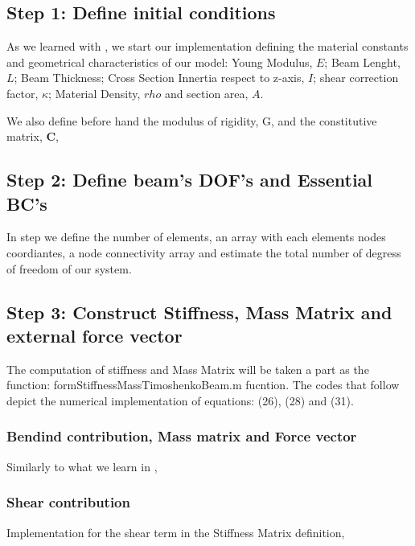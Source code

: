 \documentclass[10pt,twoside,a4paper]{article}
\renewcommand{\vec}[1]{\mathbf{#1}}
\begin{document}
\subsection{Step 1: Define initial conditions}
As we learned with \cite{Chen2013}, we start our implementation defining the material constants and geometrical characteristics of our model: Young Modulus, $E$; Beam Lenght, $L$; Beam Thickness; Cross Section Innertia respect to z-axis, $I$; shear correction factor, $\kappa$; Material Density, $rho$ and section area, $A$.



We also define before hand the modulus of rigidity, G, and the constitutive matrix, $\vec{C}$,



\subsection{Step 2: Define beam's DOF's and Essential BC's}

In step we define the number of elements, an array with each elements nodes coordiantes, a node connectivity array and estimate the total number of degress of freedom of our system.



\subsection{Step 3: Construct Stiffness, Mass Matrix and external force vector}
The computation of stiffness and Mass Matrix will be taken a part as the function: formStiffnessMassTimoshenkoBeam.m fucntion. The codes that follow depict the numerical implementation of equations: (26), (28) and (31).

\subsubsection{Bendind contribution, Mass matrix and Force vector}
Similarly to what we learn in \cite{Chen2013},



\subsubsection{Shear contribution}
Implementation for the shear term in the Stiffness Matrix definition,
\end{document}
